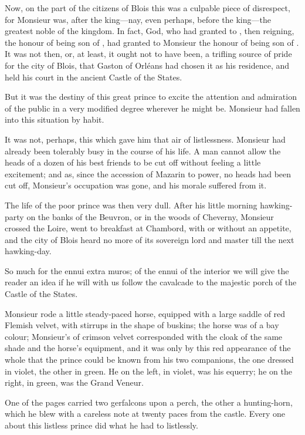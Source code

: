 Now, on the part of the citizens of Blois this was a culpable piece of disrespect, for Monsieur was, after the king—nay, even perhaps, before the king—the greatest noble of the kingdom. In fact, God, who had granted to , then reigning, the honour of being son of , had granted to Monsieur the honour of being son of . It was not then, or, at least, it ought not to have been, a trifling source of pride for the city of Blois, that Gaston of Orléans had chosen it as his residence, and held his court in the ancient Castle of the States.

But it was the destiny of this great prince to excite the attention and admiration of the public in a very modified degree wherever he might be. Monsieur had fallen into this situation by habit.

It was not, perhaps, this which gave him that air of listlessness. Monsieur had already been tolerably busy in the course of his life. A man cannot allow the heads of a dozen of his best friends to be cut off without feeling a little excitement; and as, since the accession of Mazarin to power, no heads had been cut off, Monsieur's occupation was gone, and his morale suffered from it.

The life of the poor prince was then very dull. After his little morning hawking-party on the banks of the Beuvron, or in the woods of Cheverny, Monsieur crossed the Loire, went to breakfast at Chambord, with or without an appetite, and the city of Blois heard no more of its sovereign lord and master till the next hawking-day.

So much for the ennui extra muros; of the ennui of the interior we will give the reader an idea if he will with us follow the cavalcade to the majestic porch of the Castle of the States.

Monsieur rode a little steady-paced horse, equipped with a large saddle of red Flemish velvet, with stirrups in the shape of buskins; the horse was of a bay colour; Monsieur's  of crimson velvet corresponded with the cloak of the same shade and the horse's equipment, and it was only by this red appearance of the whole that the prince could be known from his two companions, the one dressed in violet, the other in green. He on the left, in violet, was his equerry; he on the right, in green, was the Grand Veneur.

One of the pages carried two gerfalcons upon a perch, the other a hunting-horn, which he blew with a careless note at twenty paces from the castle. Every one about this listless prince did what he had to listlessly.


